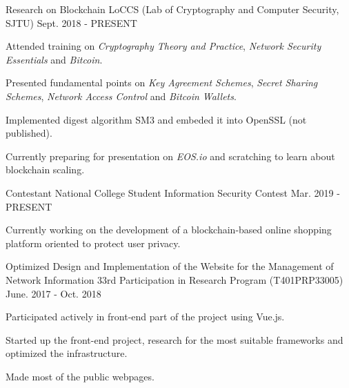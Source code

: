 


\begin{cventries}


\cventry
{Research on Blockchain} %
{LoCCS (Lab of Cryptography and Computer Security, SJTU)} %
{} %
{Sept. 2018 - PRESENT} %
{ %
\begin{cvitems}
\item {Attended training on \textit{Cryptography Theory and Practice}, \textit{Network Security Essentials} and \textit{Bitcoin}.}
\item {Presented fundamental points on \textit{Key Agreement Schemes}, \textit{Secret Sharing Schemes}, \textit{Network Access Control} and \textit{Bitcoin Wallets}.}
\item {Implemented digest algorithm SM3 and embeded it into OpenSSL (not published).}
\item {Currently preparing for presentation on \textit{EOS.io} and scratching to learn about blockchain scaling.}
\end{cvitems}
}


\cventry
{Contestant} %
{National College Student Information Security Contest} %
{} %
{Mar. 2019 - PRESENT} %
{ %
\begin{cvitems}
\item {Currently working on the development of a blockchain-based online shopping platform oriented to protect user privacy.}
\end{cvitems}
}


\cventry
{Optimized Design and Implementation of the Website for the Management of Network Information} %
{33rd Participation in Research Program (T401PRP33005)} %
{} %
{June. 2017 - Oct. 2018} %
{ %
\begin{cvitems}
\item {Participated actively in front-end part of the project using Vue.js.}
\item {Started up the front-end project, research for the most suitable frameworks and optimized the infrastructure.}
\item {Made most of the public webpages.}
\end{cvitems}
}


\end{cventries}